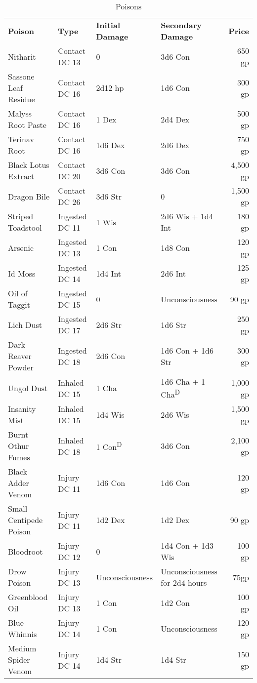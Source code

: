 \begin{table}[htb]
\mcinherit
\caption{Poisons}
\centering
\begin{tabular}{l l l l r}
\textbf{Poison} & \textbf{Type} & \textbf{Initial Damage} & \textbf{Secondary Damage} & \textbf{Price}\\
Nitharit & Contact DC 13 & 0 & 3d6 Con & 650 gp\\
Sassone Leaf Residue & Contact DC 16 & 2d12 hp & 1d6 Con & 300 gp\\
Malyss Root Paste & Contact DC 16 & 1 Dex & 2d4 Dex & 500 gp\\
Terinav Root & Contact DC 16 & 1d6 Dex & 2d6 Dex & 750 gp\\
Black Lotus Extract & Contact DC 20 & 3d6 Con & 3d6 Con & 4,500 gp\\
Dragon Bile & Contact DC 26 & 3d6 Str & 0 & 1,500 gp\\
Striped Toadstool & Ingested DC 11 & 1 Wis & 2d6 Wis + 1d4 Int & 180 gp\\
Arsenic & Ingested DC 13 & 1 Con & 1d8 Con & 120 gp\\
Id Moss & Ingested DC 14 & 1d4 Int & 2d6 Int & 125 gp\\
Oil of Taggit & Ingested DC 15 & 0 & Unconsciousness & 90 gp\\
Lich Dust & Ingested DC 17 & 2d6 Str & 1d6 Str & 250 gp\\
Dark Reaver Powder & Ingested DC 18 & 2d6 Con & 1d6 Con + 1d6 Str & 300 gp\\
Ungol Dust & Inhaled DC 15 & 1 Cha & 1d6 Cha + 1 Cha\textsuperscript{D} & 1,000 gp\\
Insanity Mist & Inhaled DC 15 & 1d4 Wis & 2d6 Wis & 1,500 gp\\
Burnt Othur Fumes & Inhaled DC 18 & 1 Con\textsuperscript{D} & 3d6 Con & 2,100 gp\\
Black Adder Venom & Injury DC 11 & 1d6 Con & 1d6 Con & 120 gp\\
Small Centipede Poison & Injury DC 11 & 1d2 Dex & 1d2 Dex & 90 gp\\
Bloodroot & Injury DC 12 & 0 & 1d4 Con + 1d3 Wis & 100 gp\\
Drow Poison & Injury DC 13 & Unconsciousness & Unconsciousness for 2d4 hours & 75gp\\
Greenblood Oil & Injury DC 13 & 1 Con & 1d2 Con & 100 gp\\
Blue Whinnis & Injury DC 14 & 1 Con & Unconsciousness & 120 gp\\
Medium Spider Venom & Injury DC 14 & 1d4 Str & 1d4 Str & 150 gp\\

\end{tabular}
\end{table}
